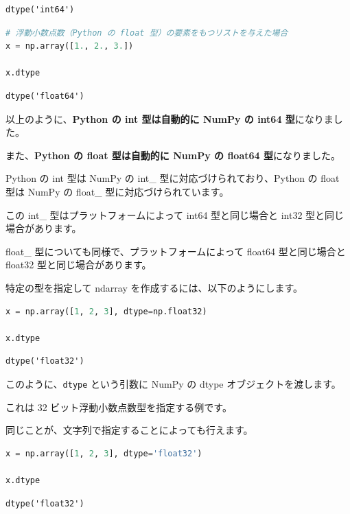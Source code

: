 \begin{lstlisting}[style=outputcell]
dtype('int64')
\end{lstlisting}

\begin{lstlisting}[style=codecell,language=Python]
# 浮動小数点数（Python の float 型）の要素をもつリストを与えた場合
x = np.array([1., 2., 3.])

x.dtype
\end{lstlisting}

\begin{lstlisting}[style=outputcell]
dtype('float64')
\end{lstlisting}

以上のように、\textbf{Python の int 型は自動的に NumPy の int64 型}になりました。

また、\textbf{Python の float 型は自動的に NumPy の float64 型}になりました。

Python の int 型は NumPy の int\_ 型に対応づけられており、Python の float 型は NumPy の float\_ 型に対応づけられています。

この int\_ 型はプラットフォームによって int64 型と同じ場合と int32 型と同じ場合があります。

float\_ 型についても同様で、プラットフォームによって float64 型と同じ場合と float32 型と同じ場合があります。


特定の型を指定して ndarray を作成するには、以下のようにします。


\begin{lstlisting}[style=codecell,language=Python]
x = np.array([1, 2, 3], dtype=np.float32)

x.dtype
\end{lstlisting}

\begin{lstlisting}[style=outputcell]
dtype('float32')
\end{lstlisting}

このように、\texttt{dtype} という引数に NumPy の dtype オブジェクトを渡します。

これは 32 ビット浮動小数点数型を指定する例です。

同じことが、文字列で指定することによっても行えます。


\begin{lstlisting}[style=codecell,language=Python]
x = np.array([1, 2, 3], dtype='float32')

x.dtype
\end{lstlisting}

\begin{lstlisting}[style=outputcell]
dtype('float32')
\end{lstlisting}

